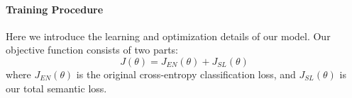 \fi


\paragraph{Training Procedure}
Here we introduce the learning and optimization details of our model. Our objective function consists of two parts:
\begin{equation}
	J(\theta) = J_{EN}(\theta) + J_{SL}(\theta)
\end{equation}
where  $J_{EN}(\theta)$ is the original cross-entropy classification loss, and $J_{SL}(\theta)$ is our total semantic loss.





